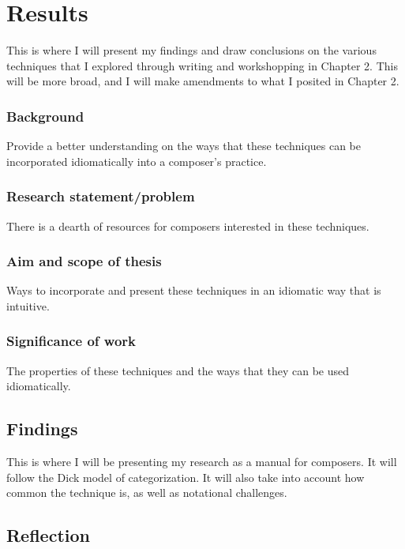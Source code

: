
\chapter{Results}
This is where I will present my findings and draw conclusions on the various techniques that I explored through writing and workshopping in Chapter 2. This will be more broad, and I will make amendments to what I posited in Chapter 2. \lipsum[4]
\subsection{Background}
Provide a better understanding on the ways that these techniques can be incorporated idiomatically into a composer's practice.

\subsection{Research statement/problem}
There is a dearth of resources for composers interested in these techniques.

\subsection{Aim and scope of thesis}
Ways to incorporate and present these techniques in an idiomatic way that is intuitive.

\subsection{Significance of work}
The properties of these techniques and the ways that they can be used idiomatically.


\lipsum[4]

\section{Findings}
This is where I will be presenting my research as a manual for composers. It will follow the Dick model of categorization.\autocite{dickOtherFlute1989} It will also take into account how common the technique is, as well as notational challenges. \lipsum[5]

\section{Reflection}
\lipsum[4]

\lipsum[4]

\lipsum[4]